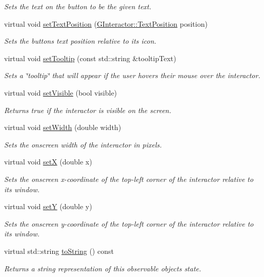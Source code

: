 \begin{DoxyCompactItemize}
\begin{DoxyCompactList}\small\item\em Sets the text on the button to be the given text. \end{DoxyCompactList}\item 
virtual void \mbox{\hyperlink{classGButton_af822b8d73c652f7c59d875d7cdfc5302}{set\+Text\+Position}} (\mbox{\hyperlink{classGInteractor_a8e0d441725a81d2bbdebbea09078260e}{G\+Interactor\+::\+Text\+Position}} position)
\begin{DoxyCompactList}\small\item\em Sets the button\textquotesingle{}s text position relative to its icon. \end{DoxyCompactList}\item 
virtual void \mbox{\hyperlink{classGInteractor_a039e0e49beaecc275efce02d416acea8}{set\+Tooltip}} (const std\+::string \&tooltip\+Text)
\begin{DoxyCompactList}\small\item\em Sets a \char`\"{}tooltip\char`\"{} that will appear if the user hovers their mouse over the interactor. \end{DoxyCompactList}\item 
virtual void \mbox{\hyperlink{classGInteractor_a18e44e30b31525a243960ca3928125aa}{set\+Visible}} (bool visible)
\begin{DoxyCompactList}\small\item\em Returns true if the interactor is visible on the screen. \end{DoxyCompactList}\item 
virtual void \mbox{\hyperlink{classGInteractor_aa3f3fba4cb131baa8696ba01e3bceca1}{set\+Width}} (double width)
\begin{DoxyCompactList}\small\item\em Sets the onscreen width of the interactor in pixels. \end{DoxyCompactList}\item 
virtual void \mbox{\hyperlink{classGInteractor_a9c18fcc579333bf9653d13ad2b372e39}{setX}} (double x)
\begin{DoxyCompactList}\small\item\em Sets the onscreen x-\/coordinate of the top-\/left corner of the interactor relative to its window. \end{DoxyCompactList}\item 
virtual void \mbox{\hyperlink{classGInteractor_a7d57e2a5c35d27feb58fd498a3cf82b9}{setY}} (double y)
\begin{DoxyCompactList}\small\item\em Sets the onscreen y-\/coordinate of the top-\/left corner of the interactor relative to its window. \end{DoxyCompactList}\item 
virtual std\+::string \mbox{\hyperlink{classGObservable_a1fe5121d6528fdea3f243321b3fa3a49}{to\+String}} () const
\begin{DoxyCompactList}\small\item\em Returns a string representation of this observable object\textquotesingle{}s state. \end{DoxyCompactList}\end{DoxyCompactItemize}
